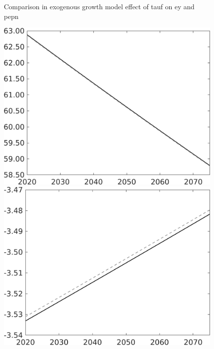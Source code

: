 \documentclass[12pt]{article}
\begin{document}
\begin{figure}{Comparison in exogenous growth model effect of tauf on ey and pepn }
\begin{minipage}[]{0.32\textwidth}
		\end{minipage}
		\begin{minipage}[]{0.32\textwidth}
			\includegraphics[width=1\textwidth]{../../codding_model/own_basedOnFried/optimalPol_010922_revision/figures/all_13Sept22/PerdifNoTauf_regime0_CompTaul_pepn_spillover0_nsk0_xgr1_knspil1_sep0_LFlimit0_emsbase0_countec0_GovRev0_etaa0.79_lgd0.png}
		\end{minipage}
	\begin{minipage}[]{0.32\textwidth}
	\includegraphics[width=1\textwidth]{../../codding_model/own_basedOnFried/optimalPol_010922_revision/figures/all_13Sept22/PerdifNoTauf_regime0_CompTaul_pn_spillover0_nsk0_xgr1_knspil1_sep0_LFlimit0_emsbase0_countec0_GovRev0_etaa0.79_lgd0.png}
\end{minipage}
	

\end{figure}
\end{document}

